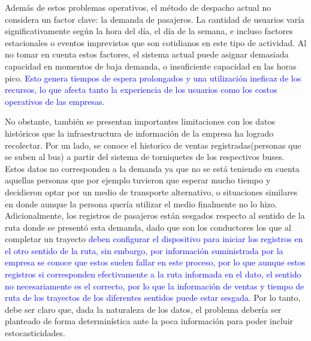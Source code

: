 \documentclass[preprint,11pt]{elsarticle}
\newcommand{\Blue}[1]{\textcolor{blue}{#1}}
\begin{document}
Además de estos problemas operativos, el método de despacho actual no considera un factor clave: la demanda de pasajeros. La cantidad de usuarios varía significativamente según la hora del día, el día de la semana, e incluso factores estacionales o eventos imprevistos que son cotidianos en este tipo de actividad. Al no tomar en cuenta estos factores, el sistema actual puede asignar demasiada capacidad en momentos de baja demanda, o insuficiente capacidad en las horas pico. \Blue{Esto genera tiempos de espera prolongados y una utilización ineficaz de los recursos, lo que afecta tanto la experiencia de los usuarios como los costos operativos de las empresas.}

No obstante, también se presentan importantes limitaciones con los datos históricos que la infraestructura de información de la empresa ha logrado recolectar. Por un lado, se conoce el historico de ventas registradas(personas que se suben al bus) a partir del sistema de torniquetes de los respectivos buses. Estos datos no corresponden a la demanda ya que no se está teniendo en cuenta aquellas personas que por ejemplo tuvieron que esperar mucho tiempo y decidieron optar por un medio de transporte alternativo, o situaciones similares en donde aunque la persona quería utilizar el medio finalmente no lo hizo. Adicionalmente, los registros de pasajeros están sesgados respecto al sentido de la ruta donde se presentó esta demanda, dado que son los conductores los que al completar un trayecto \Blue{deben configurar el dispositivo para iniciar los registros en el otro sentido de la ruta, sin embargo, por información suministrada por la empresa se conoce que estos suelen fallar en este proceso, por lo que aunque estos registros si corresponden efectivamente a la ruta informada en el dato, el sentido no necesariamente es el correcto, por lo que la información de ventas y tiempo de ruta de los trayectos de los diferentes sentidos puede estar sesgada.} Por lo tanto, debe ser claro que, dada la naturaleza de los datos, el problema debería ser planteado de forma determinística ante la poca información para poder incluir estocasticidades.
\end{document}
